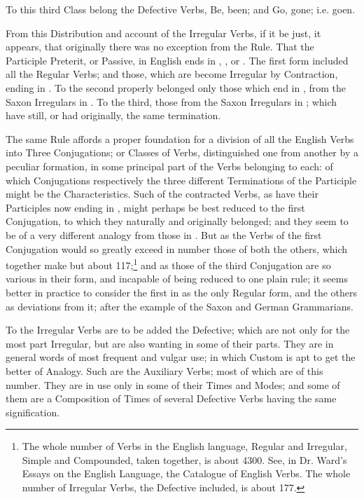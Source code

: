 To this third Class belong the Defective Verbs, Be, been; and Go, gone;
i.e. goen.

From this Distribution and account of the Irregular Verbs, if it be
just, it appears, that originally there was no exception from the Rule.
That the Participle Preterit, or Passive, in English ends in ,
, or . The first form included all the Regular Verbs; and
those, which are become Irregular by Contraction, ending in . To
the second properly belonged only those which end in , from the
Saxon Irregulars in . To the third, those from the Saxon
Irregulars in ; which have still, or had originally, the same
termination.

The same Rule affords a proper foundation for a division of all the
English Verbs into Three Conjugations; or Classes of Verbs,
distinguished one from another by a peculiar formation, in some
principal part of the Verbs belonging to each: of which Conjugations
respectively the three different Terminations of the Participle might be
the Characteristics. Such of the contracted Verbs, as have their
Participles now ending in , might perhaps be best reduced to the
first Conjugation, to which they naturally and originally belonged; and
they seem to be of a very different analogy from those in . But
as the Verbs of the first Conjugation would so greatly exceed in number
those of both the others, which together make but about
117;\footnote{The whole number of Verbs in the English language, Regular
and Irregular, Simple and Compounded, taken together, is about 4300.
See, in Dr. Ward's Essays on the English Language, the Catalogue of
English Verbs. The whole number of Irregular Verbs, the Defective
included, is about 177.} and as those of the third Conjugation are so
various in their form, and incapable of being reduced to one plain rule;
it seems better in practice to consider the first in  as the only
Regular form, and the others as deviations from it; after the example of
the Saxon and German Grammarians.

To the Irregular Verbs are to be added the Defective; which are not only
for the most part Irregular, but are also wanting in some of their
parts. They are in general words of most frequent and vulgar use; in
which Custom is apt to get the better of Analogy. Such are the Auxiliary
Verbs; most of which are of this number. They are in use only in some of
their Times and Modes; and some of them are a Composition of Times of
several Defective Verbs having the same signification.

